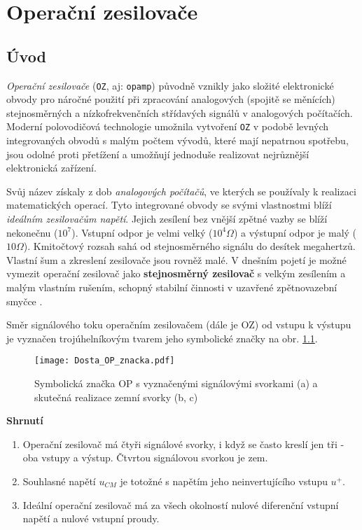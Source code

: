 \chapter{Operační zesilovače}
\minitoc
  \section{Úvod}
    \emph{Operační zesilovače} (\texttt{OZ}, aj: \texttt{opamp}) původně vznikly jako složité 
    elektronické obvody pro náročné použití při zpracování analogových (spojitě se měnících) 
    stejnosměrných a nízkofrekvenčních střídavých signálů v analogových počítačích. Moderní 
    polovodičová technologie umožnila vytvoření \texttt{OZ} v podobě levných integrovaných obvodů s 
    malým počtem vývodů, které mají nepatrnou spotřebu, jsou odolné proti přetížení a umožňují 
    jednoduše realizovat nejrůznější elektronická zařízení.
  
    Svůj název získaly z dob \emph{analogových počítačů}, ve kterých se používaly k realizaci 
    matematických operací. Tyto integrované obvody se svými vlastnostmi blíží \emph{ideálním 
    zesilovačům napětí}. Jejich zesílení bez vnější zpětné vazby se blíží nekonečnu ($10^7$). 
    Vstupní odpor je velmi velký ($10^4 \Omega$) a výstupní odpor je malý ($10 \Omega$). Kmitočtový 
    rozsah sahá od stejnosměrného signálu do desítek megahertzů. Vlastní šum a zkreslení zesilovače 
    jsou rovněž malé. V dnešním pojetí je možné vymezit operační zesilovač jako 
    \textbf{stejnosměrný zesilovač} s velkým zesílením a malým vlastním rušením, schopný stabilní 
    činnosti v uzavřené zpětnovazební smyčce \cite[s.~5]{Dostal}.

    Směr signálového toku operačním zesilovačem (dále je OZ) od vstupu k výstupu je vyznačen 
    trojúhelníkovým tvarem jeho symbolické značky na obr. \ref{AES:OP_znacka}.
    \begin{figure}[ht!]
      \centering
      \texttt{[image: Dosta\_OP\_znacka.pdf]}
      \caption[Symbolická značka OP]{Symbolická značka OP s vyznačenými signálovými svorkami (a) 
               a skutečná realizace zemní svorky (b, c)}
      \label{AES:OP_znacka}
    \end{figure}
  
    \textbf{Shrnutí}
    \begin{enumerate}\addtolength{\itemsep}{-0.5\baselineskip}
      \item Operační zesilovač má čtyři signálové svorky, i když se často kreslí jen tři - oba 
            vstupy a výstup. Čtvrtou signálovou svorkou je zem.
      \item Souhlasné napětí $u_{CM}$ je totožné s napětím jeho neinvertujícího vstupu $u^+$.
      \item Ideální operační zesilovač má za všech okolností nulové diferenční vstupní napětí a  
            nulové vstupní proudy.
    \end{enumerate}
  
